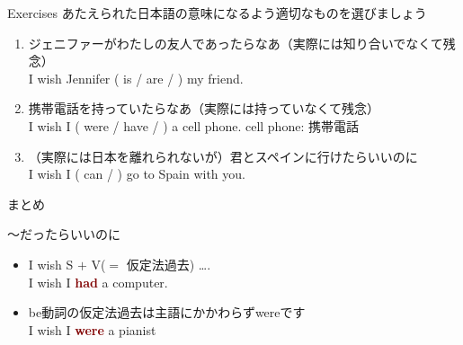 \documentclass[aspectratio=169,xcolor={dvipsnames,table}]{beamer}
\begin{document}
\begin{frame}[plain]{Exercises}
 あたえられた日本語の意味になるよう適切なものを選びましょう

\begin{enumerate}
 \item ジェニファーがわたしの友人であったらなあ（実際には知り合いでなくて残念）\\
I wish Jennifer ( is / are /  ) my friend.
 \item 携帯電話を持っていたらなあ（実際には持っていなくて残念）\\
I wish I ( were / have /  ) a cell phone.%
\hfill{}cell phone: {\scriptsize 携帯電話}
 \item （実際には日本を離れられないが）君とスペインに行けたらいいのに\\
I wish I ( can /  ) go to Spain with you.
\end{enumerate}
\end{frame}
\begin{frame}[plain]{まとめ}
 
\begin{block}{～だったらいいのに}
\small
\begin{itemize}[square]
 \item I wish S $+$ V($=$ {\scriptsize 仮定法過去}) \ldots .\\
\hspace*{40pt}I wish I \textcolor{Maroon}{\bfseries had} a computer.
 \item be動詞の仮定法過去は主語にかかわらずwereです\\
\hspace*{40pt}I wish I \textcolor{Maroon}{\bfseries were} a pianist
\end{itemize}
\end{block}



\end{frame}
\end{document}
